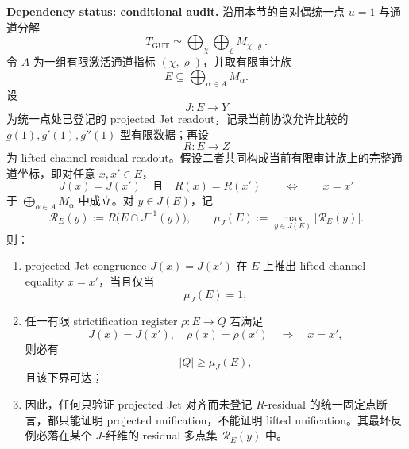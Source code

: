 \begin{proposition}\label{distill:euclid_elements-lifted_congruence_and_residual_rigidity_families-gut-projected-jet-lift-audit}
\textbf{Dependency status: conditional audit.}
沿用本节的自对偶统一点 \(u=1\) 与通道分解
\[
T_{\mathrm{GUT}}\simeq \bigoplus_{\chi}\bigoplus_{\varrho}M_{\chi,\varrho}.
\]
令 \(A\) 为一组有限激活通道指标 \((\chi,\varrho)\)，并取有限审计族
\[
E\subseteq \bigoplus_{\alpha\in A}M_\alpha.
\]
设
\[
J:E\to Y
\]
为统一点处已登记的 projected Jet readout，记录当前协议允许比较的
\(g(1),g'(1),g''(1)\) 型有限数据；再设
\[
R:E\to Z
\]
为 lifted channel residual readout。假设二者共同构成当前有限审计族上的完整通道坐标，即对任意 \(x,x'\in E\)，
\[
J(x)=J(x')\quad\text{且}\quad R(x)=R(x')
\qquad\Longleftrightarrow\qquad
x=x'
\]
于 \(\bigoplus_{\alpha\in A}M_\alpha\) 中成立。对 \(y\in J(E)\)，记
\[
\mathcal R_E(y):=R\bigl(E\cap J^{-1}(y)\bigr),\qquad
\mu_J(E):=\max_{y\in J(E)}|\mathcal R_E(y)|.
\]
则：
\begin{enumerate}
  \item projected Jet congruence
  \(J(x)=J(x')\) 在 \(E\) 上推出 lifted channel equality \(x=x'\)，当且仅当
  \[
  \mu_J(E)=1;
  \]
  \item 任一有限 strictification register \(\rho:E\to Q\) 若满足
  \[
  J(x)=J(x'),\quad \rho(x)=\rho(x')
  \quad\Longrightarrow\quad x=x',
  \]
  则必有
  \[
  |Q|\ge \mu_J(E),
  \]
  且该下界可达；
  \item 因此，任何只验证 projected Jet 对齐而未登记 \(R\)-residual 的统一固定点断言，都只能证明 projected unification，不能证明 lifted unification。其最坏反例必落在某个 \(J\)-纤维的 residual 多点集 \(\mathcal R_E(y)\) 中。
\end{enumerate}
\end{proposition}
